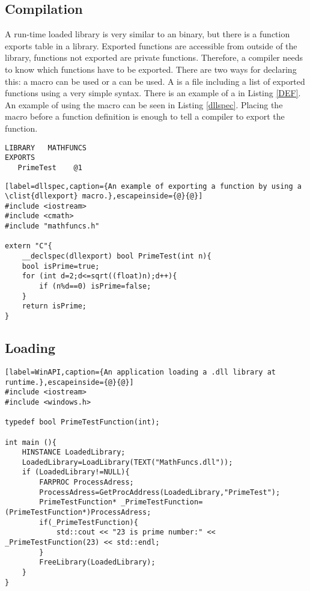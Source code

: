 \subsection*{Compilation}

A run-time loaded  library is very similar to an  binary, but there is a function exports table in a  library. Exported functions are accessible from outside of the library, functions not exported are private functions. Therefore, a compiler needs to know which functions have to be exported. There are two ways for declaring this: a  macro can be used or a  can be used. A  is a file including a list of exported functions using a very simple syntax. There is an example of a  in Listing \ref{DEF}. An example of using the  macro can be seen in Listing \ref{dllspec}. Placing the macro before a function definition is enough to tell a compiler to export the function.

\begin{lstlisting}[label=DEF,caption={A \clist{Module Definition File} of a library called ``Mathfuncs'' including a function called ``PrimeTest''.}]
LIBRARY   MATHFUNCS
EXPORTS
   PrimeTest	@1
\end{lstlisting}


\begin{lstlisting}[label=dllspec,caption={An example of exporting a function by using a \clist{dllexport} macro.},escapeinside={@}{@}]
#include <iostream>
#include <cmath>
#include "mathfuncs.h"

extern "C"{
	__declspec(dllexport) bool PrimeTest(int n){
	bool isPrime=true;
	for (int d=2;d<=sqrt((float)n);d++){
		if (n%d==0) isPrime=false;
	}
	return isPrime;
}
\end{lstlisting}

\subsection*{Loading}
\label{sec:runtimeloading}

\begin{lstlisting}[label=WinAPI,caption={An application loading a .dll library at runtime.},escapeinside={@}{@}]
#include <iostream>
#include <windows.h>

typedef bool PrimeTestFunction(int);

int main (){
	HINSTANCE LoadedLibrary;
	LoadedLibrary=LoadLibrary(TEXT("MathFuncs.dll"));
	if (LoadedLibrary!=NULL){
		FARPROC ProcessAdress;
		ProcessAdress=GetProcAddress(LoadedLibrary,"PrimeTest");
		PrimeTestFunction* _PrimeTestFunction=(PrimeTestFunction*)ProcessAdress;
		if(_PrimeTestFunction){
			std::cout << "23 is prime number:" << _PrimeTestFunction(23) << std::endl;
		}
		FreeLibrary(LoadedLibrary);
	}
}
\end{lstlisting}

